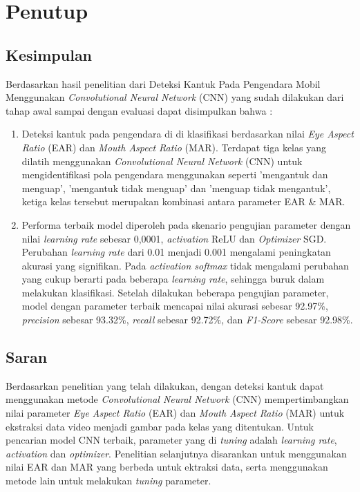 \chapter{Penutup}

\section{Kesimpulan}

Berdasarkan hasil penelitian dari Deteksi Kantuk Pada Pengendara Mobil 
Menggunakan \textit{Convolutional Neural Network} (CNN) yang sudah 
dilakukan dari tahap awal sampai dengan evaluasi dapat disimpulkan bahwa : 

    \begin{enumerate}
        \item Deteksi kantuk pada pengendara di di klasifikasi berdasarkan nilai \textit{Eye Aspect Ratio} (EAR) dan \textit{Mouth Aspect Ratio} (MAR).
        Terdapat tiga kelas yang dilatih menggunakan \textit{Convolutional Neural Network} (CNN) untuk mengidentifikasi pola pengendara menggunakan seperti ’mengantuk dan menguap’, ’mengantuk tidak menguap’ dan ’menguap tidak mengantuk’, ketiga kelas tersebut merupakan kombinasi antara parameter EAR \& MAR.
        
        \item Performa terbaik model diperoleh pada skenario pengujian parameter dengan nilai \textit{learning rate} sebesar 0,0001, \textit{activation} ReLU dan \textit{Optimizer} SGD. Perubahan \textit{learning rate} dari 0.01 menjadi 0.001 mengalami peningkatan akurasi yang signifikan. Pada \textit{activation softmax} tidak mengalami perubahan yang cukup berarti pada beberapa \textit{learning rate}, sehingga buruk dalam melakukan klasifikasi. Setelah dilakukan beberapa pengujian parameter, model dengan parameter terbaik mencapai nilai akurasi sebesar 92.97\%, \textit{precision} sebesar 93.32\%, \textit{recall} sebesar 92.72\%, dan \textit{F1-Score} sebesar 92.98\%.
    \end{enumerate}


\section{Saran}

Berdasarkan penelitian yang telah dilakukan, dengan deteksi kantuk dapat menggunakan metode \textit{Convolutional Neural Network} (CNN) mempertimbangkan nilai parameter \textit{Eye Aspect Ratio} (EAR) dan \textit{Mouth Aspect Ratio} (MAR) untuk ekstraksi data video menjadi gambar pada kelas yang ditentukan. Untuk pencarian model CNN terbaik, parameter yang di \textit{tuning} adalah \textit{learning rate}, \textit{activation} dan \textit{optimizer}. Penelitian selanjutnya disarankan untuk menggunakan nilai EAR dan MAR yang berbeda untuk ektraksi data, serta menggunakan metode lain untuk melakukan \textit{tuning} parameter.








